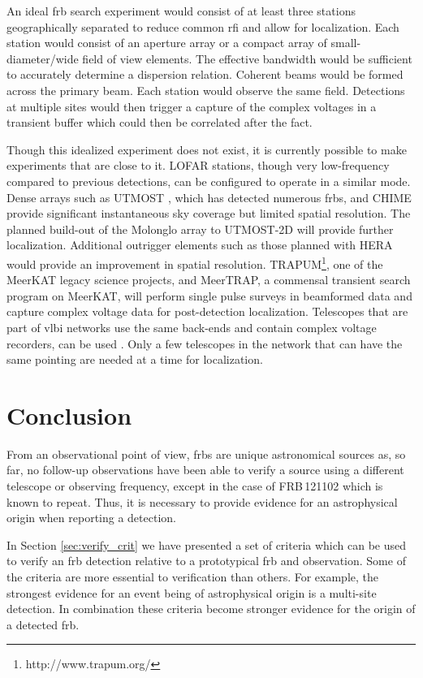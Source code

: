 \documentclass[a4paper,fleqn,usenatbib]{mnras}
\begin{document}
An ideal \gls{frb} search experiment would consist of at least three stations
geographically separated to reduce common \gls{rfi} and allow for localization.
Each station would consist of an aperture array or a compact array of
small-diameter/wide field of view elements. The effective bandwidth would be
sufficient to accurately determine a dispersion relation.  Coherent beams would
be formed across the primary beam. Each station would observe the same field.
Detections at multiple sites would then trigger a capture of the complex
voltages in a transient buffer which could then be correlated after the fact. 

Though this idealized experiment does not exist, it is currently possible to
make experiments that are close to it. LOFAR stations, though very low-frequency
compared to previous detections, can be configured to operate in a similar mode.
Dense arrays such as UTMOST \citep{2017MNRAS.468.3746C}, which has detected
numerous \glspl{frb}, and CHIME \citep{Chime2018} provide significant
instantaneous sky coverage but limited spatial resolution. The planned build-out
of the Molonglo array to UTMOST-2D will provide further localization.
Additional outrigger elements such as those planned with HERA
\citep{2017PASP..129d5001D} would provide an improvement in spatial resolution.
TRAPUM\footnote{http://www.trapum.org/}, one of the MeerKAT legacy science
projects,  and MeerTRAP, a commensal transient search program on MeerKAT, will
perform single pulse surveys in beamformed data and capture complex voltage data
for post-detection localization.  Telescopes that are part of \gls{vlbi}
networks use the same back-ends and contain complex voltage recorders, can be
used \citep{2018arXiv180401904W}. Only a few telescopes in the network that can
have the same pointing are needed at a time for localization.

\section{Conclusion}

From an observational point of view, \glspl{frb} are unique astronomical sources
as, so far, no follow-up observations have been able to verify a source using a
different telescope or observing frequency, except in the case of FRB\,121102
which is known to repeat. Thus, it is necessary to provide evidence for an
astrophysical origin when reporting a detection.

In Section \ref{sec:verify_crit} we have presented a set of criteria which can
be used to verify an \gls{frb} detection relative to a prototypical \gls{frb}
and observation. Some of the criteria are more essential to verification than
others.  For example, the strongest evidence for an event being of astrophysical
origin is a multi-site detection.  In combination these criteria become stronger
evidence for the origin of a detected \gls{frb}.
\end{document}

